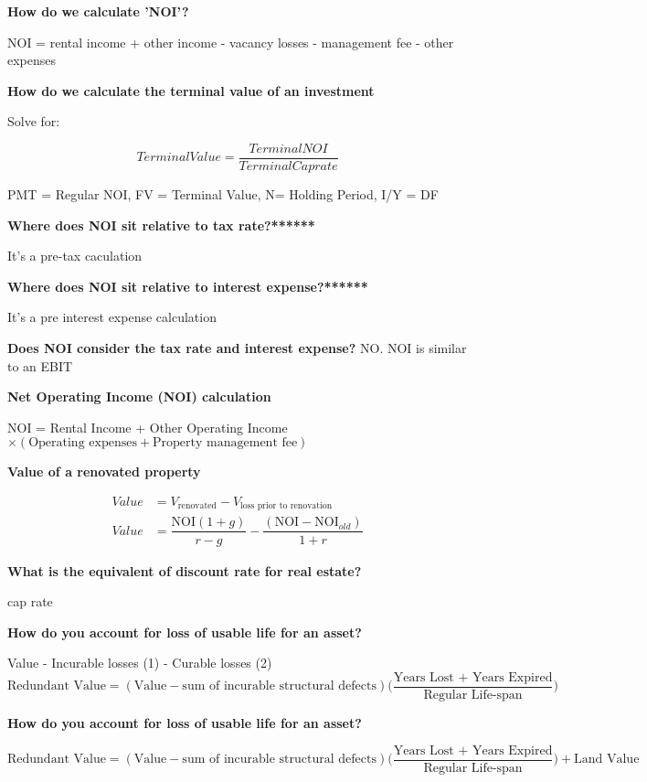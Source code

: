 \documentclass[12pt]{article}
\begin{document}
\newpage

\textbf{How do we calculate 'NOI'?}

NOI = rental income + other income - vacancy losses - management fee - other expenses

\textbf{How do we calculate the terminal value of an investment}

Solve for:

$$
Terminal Value = \dfrac{Terminal NOI}{Terminal Caprate}
$$

PMT = Regular NOI, FV = Terminal Value, N= Holding Period, I/Y = DF


\textbf{Where does NOI sit relative to tax rate?******}

It's a pre-tax caculation

\textbf{Where does NOI sit relative to interest expense?******}

It's a pre interest expense calculation

\textbf{Does NOI consider the tax rate and interest expense?}
NO. NOI is similar to an EBIT

\textbf{Net Operating Income (NOI) calculation}

NOI = Rental Income + Other Operating Income $\times (\text{Operating expenses} + \text{Property management fee})$

\textbf{Value of a renovated property}

\begin{equation}
\begin{split}
Value  & = V_{\text{renovated}} - V_{\text{loss prior to renovation}} \\
Value  & = \dfrac{\text{NOI}(1+g)}{r - g} - \dfrac{(\text{NOI}  -  \text{NOI}_{old})}{1 + r}
\end{split}
\end{equation}

\textbf{What is the equivalent of discount rate for real estate?}

cap rate

\textbf{How do you account for loss of usable life for an asset?}

Value - Incurable losses (1) - Curable losses (2)
$$
\text{Redundant Value} = (\text{Value} - \text{sum of incurable structural defects}) \Biggr( \dfrac{\text{Years Lost + Years Expired}}{\text{Regular Life-span}} \Biggl)
$$

\textbf{How do you account for loss of usable life for an asset?}

\begin{equation}
\text{Redundant Value} = (\text{Value} - \text{sum of incurable structural defects}) \Biggr( \dfrac{\text{Years Lost + Years Expired}}{\text{Regular Life-span}} \Biggl) + \text{Land Value}
\end{equation}
\end{document}
